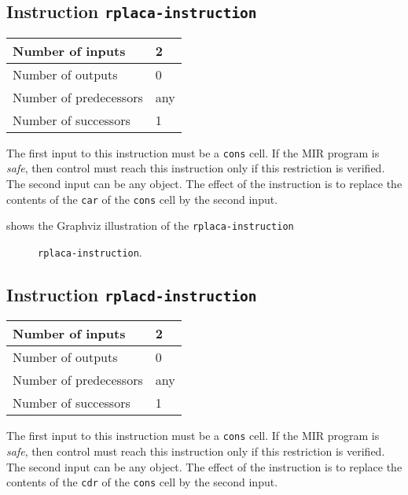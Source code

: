 \subsection{Instruction \texttt{rplaca-instruction}}
\label{mir-instruction-rplaca}

\begin{tabular}{|l|l|}
\hline
Number of inputs & 2\\
\hline
Number of outputs & 0\\
\hline
Number of predecessors & any\\
\hline
Number of successors & 1\\
\hline
\end{tabular}

The first input to this instruction must be a \texttt{cons} cell.  If
the MIR program is \emph{safe}, then control must reach this
instruction only if this restriction is verified.  The second input
can be any object.  The effect of the instruction is to replace the
contents of the \texttt{car} of the \texttt{cons} cell by the second
input.

 shows the Graphviz illustration of the
\texttt{rplaca-instruction}

\begin{figure}
\begin{center}
\end{center}
\caption{\label{fig-rplaca-instruction}
\texttt{rplaca-instruction}.}
\end{figure}

\subsection{Instruction \texttt{rplacd-instruction}}
\label{mir-instruction-rplacd}

\begin{tabular}{|l|l|}
\hline
Number of inputs & 2\\
\hline
Number of outputs & 0\\
\hline
Number of predecessors & any\\
\hline
Number of successors & 1\\
\hline
\end{tabular}

The first input to this instruction must be a \texttt{cons} cell.  If
the MIR program is \emph{safe}, then control must reach this
instruction only if this restriction is verified.  The second input
can be any object.  The effect of the instruction is to replace the
contents of the \texttt{cdr} of the \texttt{cons} cell by the second
input.

